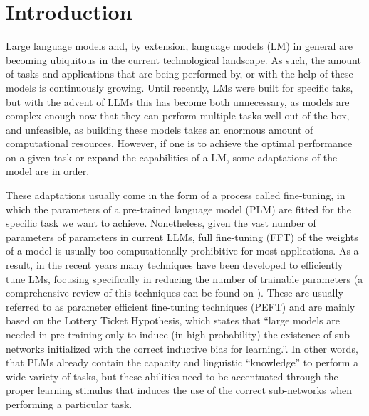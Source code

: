 \documentclass[fleqn,moreauthors,10pt]{ds_report}
\affiliation{\textit{Advisors: Slavko Žitnik}}
\begin{document}
\flushbottom 

\maketitle 

\thispagestyle{empty} 


\section*{Introduction}

    Large language models and, by extension, language models (LM) in general are becoming ubiquitous in the current technological landscape. As such, the amount of tasks and applications that are being performed by, or with the help of these models is continuously growing. Until recently, LMs were built for specific taks, but with the advent of LLMs this has become both unnecessary, as models are complex enough now that they can perform multiple tasks well out-of-the-box, and unfeasible, as building these models takes an enormous amount of computational resources. However, if one is to achieve the optimal performance on a given task or expand the capabilities of a LM, some adaptations of the model are in order.
    
    These adaptations usually come in the form of a process called fine-tuning, in which the parameters of a pre-trained language model (PLM) are fitted for the specific task we want to achieve. Nonetheless, given the vast number of parameters of parameters in current LLMs, full fine-tuning (FFT) of the weights of a model is usually too computationally prohibitive for most applications. As a result, in the recent years many techniques have been developed to efficiently tune LMs, focusing specifically in reducing the number of trainable parameters (a comprehensive review of this techniques can be found on \cite{survey}). These are usually referred to as parameter efficient fine-tuning techniques (PEFT) and are mainly based on the Lottery Ticket Hypothesis, which states that ``large models are needed in pre-training only to induce (in high probability) the existence of sub-networks initialized with the correct inductive bias for learning.''. In other words, that PLMs already contain the capacity and linguistic ``knowledge'' to perform a wide variety of tasks, but these abilities need to be accentuated through the proper learning stimulus that induces the use of the correct sub-networks when performing a particular task. 
\end{document}

